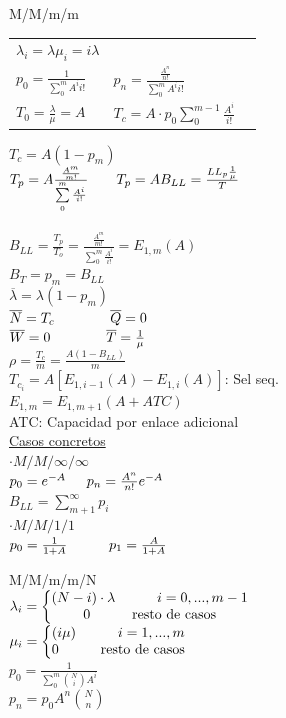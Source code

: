 \begin{minipage}{.22\textwidth}
	M/M/m/m
	\begin{tabular}{lp{3cm} l}
		$\lambda_i=\lambda{\mu_i}=i{\lambda}$ &                                                    \\
		$p_0=\frac{1}{\sum_0^m{A^i}{i!}}$     & $p_n=\frac{\frac{A^n}{n!}}{\sum_0^m{A^i}{i!}}$     \\
		$T_0=\frac{\lambda}{\mu}=A$           & $T_c=A\cdot{p_0}\sum\limits_0^{m-1}\frac{A^i}{i!}$ \\
	\end{tabular}
	$T_c=A(1-p_m)$ \\
	$T_p=A\frac{\frac{A^m}{m!}}{\sum\limits_0^m{\frac{A^i}{i!}}} \hskip 2em T_p=AB_{LL}=\frac{LL_p\frac{1}{\mu}}{T}$ \\ \\
	$B_{LL}=\frac{T_p}{T_o} = \frac{\frac{A^m}{m!}}{\sum\limits_0^m{\frac{A^i}{i!}}} = E_{1,m}(A)$ \\
	$B_T = p_m = B_{LL}$ \\
	$\overline{\lambda} = \lambda{(1-p_m)}$ \\
	$\overline{N} = T_c \hskip 4em \overline{Q} = 0$             \\
	$\overline{W} = 0  \hskip 4em \overline{T} = \frac{1}{\mu}$ \\
	$\rho = \frac{T_c}{m}=\frac{A(1-B_{LL})}{m}$ \\
	$T_{c_i} = A[E_{1,i-1}(A)-E_{1,i}(A)]$: Sel seq. \\
	$E_{1,m} = E_{1,m+1}(A+ATC)$ \\
	ATC: Capacidad por enlace adicional \\
	{\underline{Casos concretos}} \\
	$\cdot M/M/\infty/\infty$ \\
	$p_0=e^{-A} \hskip 1.5em p_n=\frac{A^n}{n!}e^{-A}$ \\
	$B_{LL}=\sum\limits_{m+1}^{\infty}p_i$ \\
	$\cdot M/M/1/1$ \\
	$p_0 = \frac{1}{1+A} \hskip 3em p_1=\frac{A}{1+A}$ \\
\end{minipage}

\begin{minipage}{.22\textwidth}
	M/M/m/m/N \\
	$\lambda_i = \left \{  \begin{matrix} (N-i) \cdot \lambda \hskip 3em i=0,...,m-1 \\
			0 \hskip 3em \text{resto de casos}\end{matrix}  \right .$ \\
	$\mu_i = \left \{  \begin{matrix} (i\mu) \hskip 3em  i=1,...,m \\
			0 \hskip 3em \text{resto de casos}\end{matrix}  \right .$ \\
	$p_0=\frac{1}{\sum_0^m{\binom{N}{i}{A^i}}}$ \\
	$p_n = {p_0}{A^n}\binom{N}{n}$ \\
\end{minipage}


